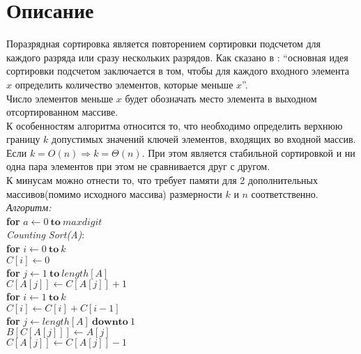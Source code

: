 \documentclass[pdf, unicode, 12pt, a4paper,oneside,fleqn]{article}
\begin{document}
    \section{Описание}
    Поразрядная сортировка является повторением сортировки подсчетом для каждого разряда или сразу нескольких разрядов.
Как сказано в \cite{Kormen}: \enquote{основная идея сортировки подсчетом заключается в том, чтобы для каждого входного 
элемента $x$ определить количество элементов, которые меньше $x$}.\\
Число элементов меньше $x$ будет обозначать место элемента в выходном отсортированном массиве.\\

К особенностям алгоритма относится то, что необходимо определить верхнюю границу $k$ допустимых значений ключей элементов, входящих во входной массив. Если $k = O(n) \Rightarrow k = \Theta(n)$. При этом является стабильной сортировкой и ни одна пара элементов при этом не сравнивается друг с другом.\\
К минусам можно отнести то, что требует памяти для 2 дополнительных массивов(помимо исходного массива) размерности $k$ и $n$ соответственно.\\

{\it Алгоритм:}\\


{   \textbf{for} $a \leftarrow 0 \: \textbf{to} \: max digit$\\
    \it Counting Sort(A)}:\\
\textbf{for} $i \leftarrow 0 \: \textbf{to} \: k$\\
  {\hspace*{0.5cm}$ C[i] \leftarrow 0$}\\
\textbf{for} $j \leftarrow 1 \: \textbf{to} \: length[A]$\\
  {\hspace*{0.5cm}$ C[A[j]] \leftarrow C[A[j]] + 1$}\\
\textbf{for} $i \leftarrow 1 \: \textbf{to} \: k$\\
  {\hspace*{0.5cm} $ C[i] \leftarrow C[i] + C[i-1]$}\\
\textbf{for} $j \leftarrow length[A] \: \textbf{downto} \: 1$\\
  {\hspace*{0.5cm}$ B[C[A[j]]] \leftarrow A[j]$}\\
  {\hspace*{0.5cm}$ C[A[j]] \leftarrow C[A[j]]-1$}\\
\end{document}
